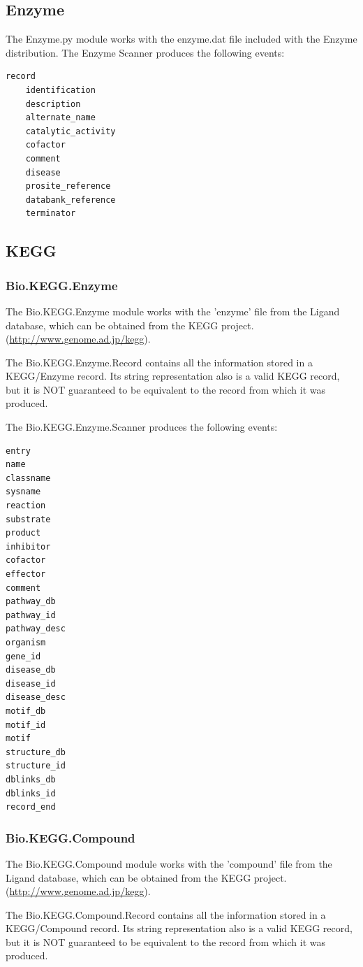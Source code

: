 \documentclass{report}
\begin{document}
\subsection{Enzyme}
The Enzyme.py module works with the enzyme.dat file included with the
Enzyme distribution.
The Enzyme Scanner produces the following events:
\begin{verbatim}
record
    identification
    description
    alternate_name
    catalytic_activity
    cofactor
    comment
    disease
    prosite_reference
    databank_reference
    terminator
\end{verbatim}

\subsection{KEGG}

\subsubsection{Bio.KEGG.Enzyme}

The Bio.KEGG.Enzyme module works with the 'enzyme' file from the
Ligand database, which can be obtained from the KEGG project. 
(\url{http://www.genome.ad.jp/kegg}).

The Bio.KEGG.Enzyme.Record contains all the information stored in
a KEGG/Enzyme record. Its string representation also is a valid KEGG
record, but it is NOT guaranteed to be equivalent to the record
from which it was produced.

The Bio.KEGG.Enzyme.Scanner produces the following events:

\begin{verbatim}
entry 
name 
classname
sysname
reaction
substrate
product
inhibitor 
cofactor
effector
comment 
pathway_db 
pathway_id
pathway_desc
organism 
gene_id
disease_db
disease_id 
disease_desc
motif_db
motif_id
motif
structure_db 
structure_id
dblinks_db
dblinks_id
record_end
\end{verbatim}

\subsubsection{Bio.KEGG.Compound}

The Bio.KEGG.Compound module works with the 'compound' file from the
Ligand database, which can be obtained from the KEGG project. 
(\url{http://www.genome.ad.jp/kegg}).

The Bio.KEGG.Compound.Record contains all the information stored in
a KEGG/Compound record. Its string representation also is a valid KEGG
record, but it is NOT guaranteed to be equivalent to the record
from which it was produced.
\end{document}

